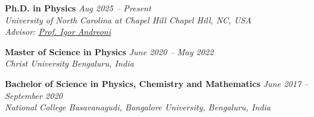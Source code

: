 \textbf{Ph.D. in Physics} \hfill \textit{Aug 2025 -- Present} \\
\textit{University of North Carolina at Chapel Hill \hfill Chapel Hill, NC, USA \\
Advisor: \href{https://physics.unc.edu/people/igor-andreoni/}{Prof. Igor Andreoni}}

\vspace{0.5em}

\textbf{Master of Science in Physics} \hfill \textit{June 2020 -- May 2022} \\
\textit{Christ University \hfill Bengaluru, India} \\


\vspace{0.5em}

\textbf{Bachelor of Science in Physics, Chemistry and Mathematics} \hfill \textit{June 2017 -- September 2020} \\
\textit{National College Basavanagudi, Bangalore University, \hfill Bengaluru, India} \\